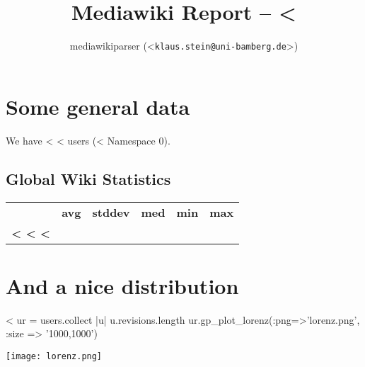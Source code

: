 \documentclass{scrartcl}
\title{Mediawiki Report -- <%
}
\author{mediawikiparser (<\texttt{klaus.stein@uni-bamberg.de}>)}
\begin{document}
\maketitle

\section{Some general data}

We have <%
<%
users (<%
Namespace 0).

\subsection*{Global Wiki Statistics}

\begin{tabular}{>{\bfseries}lrrrrr}
  &\textbf{avg} &\textbf{stddev} &\textbf{med} &\textbf{min} &\textbf{max}\\
  <%
  <%
  <%
\end{tabular}

\section{And a nice distribution}
<%
ur = users.collect { |u| u.revisions.length }
ur.gp_plot_lorenz(:png=>'lorenz.png', :size => '1000,1000') 
\begin{center}
  \texttt{[image: lorenz.png]}
\end{center}
\end{document}
